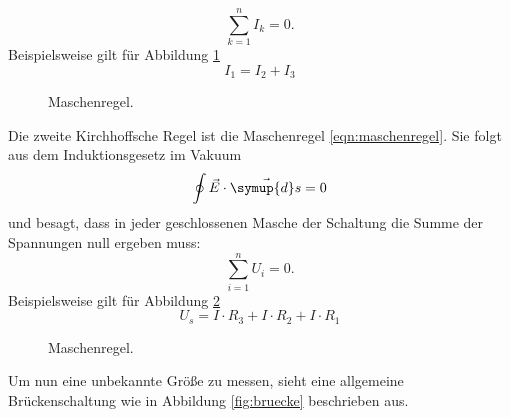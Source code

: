 \begin{equation}
  \sum_{k=1}^n I_k = 0.
  \label{eqn:knotenregel}
\end{equation}
Beispielsweise gilt für Abbildung \ref{fig:knotenregel}
\begin{equation}
I_1 = I_2 + I_3
\end{equation}
\begin{figure}[H]
  \centering
  \caption{Maschenregel.}
  \label{fig:knotenregel}
\end{figure}
Die zweite Kirchhoffsche Regel ist die Maschenregel \eqref{eqn:maschenregel}.
Sie folgt aus dem Induktionsgesetz im Vakuum
\begin{equation}
\oint \vec{E} \cdot \vec{\symup{d}s} = 0
\end{equation}
und besagt, dass in jeder geschlossenen Masche der Schaltung die Summe der Spannungen null ergeben muss:
\begin{equation}
  \sum_{i=1}^n U_i = 0.
  \label{eqn:maschenregel}
\end{equation}
Beispielsweise gilt für Abbildung \ref{fig:maschenregel}
\begin{equation}
U_s = I \cdot R_3 + I \cdot R_2 + I \cdot R_1
\end{equation}
\begin{figure}[H]
  \centering
    \caption{Maschenregel.}
    \label{fig:maschenregel}
\end{figure}

Um nun eine unbekannte Größe zu messen, sieht eine allgemeine Brückenschaltung wie in Abbildung \ref{fig:bruecke} beschrieben aus.

